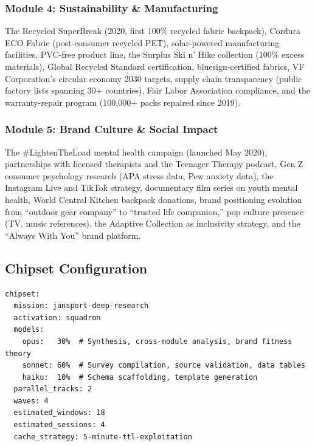 \documentclass[11pt,letterpaper]{article}
\begin{document}
\subsubsection{Module 4: Sustainability \& Manufacturing}

The Recycled SuperBreak (2020, first 100\% recycled fabric backpack), Cordura ECO Fabric (post-consumer recycled PET), solar-powered manufacturing facilities, PVC-free product line, the Surplus Ski n' Hike collection (100\% excess materials), Global Recycled Standard certification, bluesign-certified fabrics, VF Corporation's circular economy 2030 targets, supply chain transparency (public factory lists spanning 30+ countries), Fair Labor Association compliance, and the warranty-repair program (100,000+ packs repaired since 2019).

\subsubsection{Module 5: Brand Culture \& Social Impact}

The \#LightenTheLoad mental health campaign (launched May 2020), partnerships with licensed therapists and the Teenager Therapy podcast, Gen Z consumer psychology research (APA stress data, Pew anxiety data), the Instagram Live and TikTok strategy, documentary film series on youth mental health, World Central Kitchen backpack donations, brand positioning evolution from ``outdoor gear company'' to ``trusted life companion,'' pop culture presence (TV, music references), the Adaptive Collection as inclusivity strategy, and the ``Always With You'' brand platform.

\subsection{Chipset Configuration}

\begin{asciibox}
\begin{verbatim}
chipset:
  mission: jansport-deep-research
  activation: squadron
  models:
    opus:   30%  # Synthesis, cross-module analysis, brand fitness theory
    sonnet: 60%  # Survey compilation, source validation, data tables
    haiku:  10%  # Schema scaffolding, template generation
  parallel_tracks: 2
  waves: 4
  estimated_windows: 18
  estimated_sessions: 4
  cache_strategy: 5-minute-ttl-exploitation
\end{verbatim}
\end{asciibox}
\end{document}
